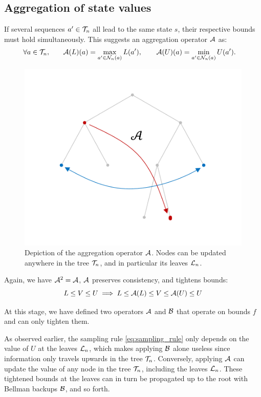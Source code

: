 \documentclass{article}
\begin{document}
\subsection{Aggregation of state values}
\label{sec:aggregation}


\begin{definition}
If several sequences $a'\in\mathcal{T}_n$ all lead to the same state $s$, their respective bounds must hold simultaneously. This suggests an aggregation operator $\mathcal{A}$ as:
    \begin{align}
    \label{eq:aggregation}
        \forall a\in\mathcal{T}_n, \qquad &\mathcal{A}(L)(a) = \max_{a'\in \mathcal{N}_n(a)} L(a'),\qquad \mathcal{A}(U)(a) = \min_{a'\in \mathcal{N}_n(a)} U(a').                                   
    \end{align}
\end{definition}

\begin{figure}[H]
	\centering
	\includegraphics[trim={1.8cm 1.8cm 1.9cm 1.8cm}, clip,width=0.4\linewidth]{img/tree_3}
	\caption{Depiction of the aggregation operator $\mathcal{A}$. Nodes can be updated anywhere in the tree $\mathcal{T}_n$, and in particular its leaves $\mathcal{L}_n$.}
\end{figure}

\begin{lemma}
Again, we have $\mathcal{A}^2=\mathcal{A}$, $\mathcal{A}$ preserves consistency, and tightens bounds:
\begin{equation*}
    L\leq V \leq U \implies L\leq \mathcal{A}(L) \leq V \leq \mathcal{A}(U) \leq U
\end{equation*}
\end{lemma}

At this stage, we have defined two operators $\mathcal{A}$ and $\mathcal{B}$ that operate on bounds $f$ and can only tighten them.


\begin{remark}
As observed earlier, the sampling rule \eqref{eq:sampling_rule} only depends on the value of $U$ at the leaves $\mathcal{L}_n$, which makes applying $\mathcal{B}$ alone useless since information only travels upwards in the tree $\mathcal{T}_n$. Conversely, applying $\mathcal{A}$ can update the value of any node in the tree $\mathcal{T}_n$, including the leaves $\mathcal{L}_n$. These tightened bounds at the leaves can in turn be propagated up to the root with Bellman backups $\mathcal{B}$, and so forth.
\end{remark}
\end{document}
